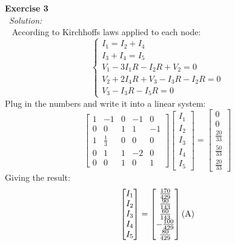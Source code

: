 \documentclass[12pt]{article}
\def\es#1#2{{\bf Exercise #1}\\~{\it Solution:}\\~#2\\[1em]}
\begin{document}
\es{3}{
According to Kirchhoffs laws applied to each node:
\begin{equation*}
\begin{cases}
I_1=I_2+I_4\\
I_3+I_4=I_5\\
V_1-3I_1R-I_2R+V_2=0\\
V_2+2I_4R+V_3-I_3R-I_2R=0\\
V_3-I_3R-I_5R=0
\end{cases}
\end{equation*}
Plug in the numbers and write it into a linear system:
\begin{equation*}
\begin{bmatrix}
		   1 & -1 & 0 & -1 & 0 \\
		   0 & 0 & 1 & 1 & -1 \\
		   1 & \frac{1}{3} & 0 & 0 & 0 \\
           0 & 1 & 1 & -2 & 0 \\
           0 & 0 & 1 & 0 & 1
\end{bmatrix}
\begin{bmatrix}
I_1 \\
I_2 \\
I_3 \\
I_4 \\
I_5
\end{bmatrix}
=
\begin{bmatrix}
 0 \\
 0 \\
 \frac{20}{33} \\
 \frac{50}{33} \\
 \frac{20}{33}
\end{bmatrix}
\end{equation*}
Giving the result:
\begin{equation*}
\begin{bmatrix}
I_1 \\
I_2 \\
I_3 \\
I_4 \\
I_5
\end{bmatrix}
=
\begin{bmatrix}
 \frac{170}{429} \\
 \frac{90}{143} \\
 \frac{60}{143}\\
 -\frac{100}{429}\\
\frac{80}{429}
\end{bmatrix}
({\rm A})
\end{equation*}
}
\end{document}
